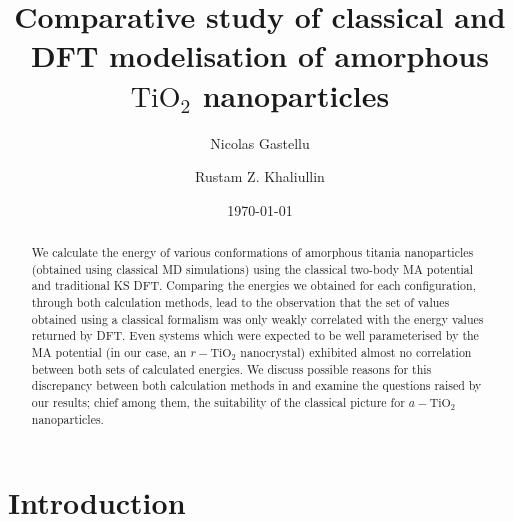 \documentclass[aps,prb,twocolumn,amsmath,amssymb,superscriptaddress,longbibliography]{revtex4-1}
\begin{document}
\title{
Comparative study of classical and DFT modelisation of amorphous $\text{TiO}_2$ nanoparticles
}

\author{Nicolas Gastellu}
\author{Rustam Z. Khaliullin}

\date{\today}

\begin{abstract}

We calculate the energy of various conformations of amorphous titania nanoparticles (obtained using classical MD simulations) using the classical two-body MA potential and traditional KS DFT.
Comparing the energies we obtained for each configuration, through both calculation methods, lead to the observation that the set of values obtained using a classical formalism was only weakly correlated with the energy values returned by DFT.
Even systems which were expected to be well parameterised  by the MA potential (in our case, an $r-\text{TiO}_2$ nanocrystal) exhibited almost no correlation between both sets of calculated energies.
We discuss possible reasons for this discrepancy between both calculation methods in and examine the questions raised by our results; chief among them, the suitability of the classical picture for $a-\text{TiO}_2$ nanoparticles.

\end{abstract}

\maketitle
 

\section*{Introduction} 
\end{document}
